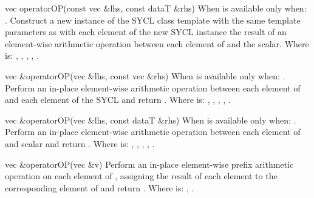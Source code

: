   \addRow
  {vec operatorOP(const vec \&lhs, const dataT \&rhs)}
  {
    When  is \codeinline{\%} available only when: .
    \newline
    Construct a new instance of the SYCL  class template with the same template parameters as   with each element of the new SYCL  instance the result of an element-wise  arithmetic operation between each element of   and the  scalar.
    \newline \newline
    Where  is: \codeinline{+}, \codeinline{-}, \codeinline{*}, \codeinline{/}, \codeinline{\%}.
  }

  \addRow
  {vec \&operatorOP(vec \&lhs, const vec \&rhs)}
  {
    When  is \codeinline{\%=} available only when: .
    \newline
    Perform an in-place element-wise  arithmetic operation between each element of   and each element of the  SYCL  and return  .
    \newline \newline
    Where  is: \codeinline{+=}, \codeinline{-=}, \codeinline{*=}, \codeinline{/=}, \codeinline{\%=}.
  }

   \addRow
  {vec \&operatorOP(vec \&lhs, const dataT \&rhs)}
  {
    When  is \codeinline{\%=} available only when: .
    \newline
    Perform an in-place element-wise  arithmetic operation between each element of   and  scalar and return  .
    \newline \newline
    Where  is: \codeinline{+=}, \codeinline{-=}, \codeinline{*=}, \codeinline{/=}, \codeinline{\%=}.
  }

  \addRow
  {vec \&operatorOP(vec \&v)}
  {
    Perform an in-place element-wise  prefix arithmetic operation on each element of  , assigning the result of each element to the corresponding element of   and return  .
    \newline \newline
    Where  is: \codeinline{++}, \codeinline{--}. 
  }

